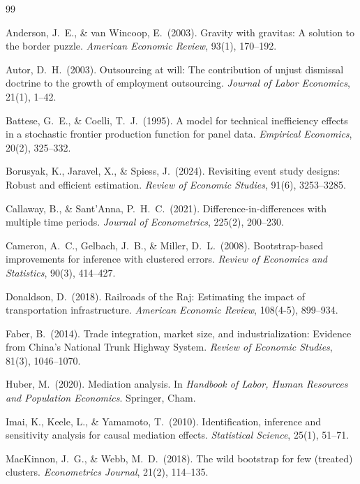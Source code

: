 \documentclass[12pt, a4paper]{article}
\begin{document}
\begin{thebibliography}{99}
\small
\setlength{\itemsep}{2pt}

 Anderson, J.\ E., \& van Wincoop, E.\ (2003). Gravity with gravitas: A solution to the border puzzle. \textit{American Economic Review}, 93(1), 170--192.

 Autor, D.\ H.\ (2003). Outsourcing at will: The contribution of unjust dismissal doctrine to the growth of employment outsourcing. \textit{Journal of Labor Economics}, 21(1), 1--42.

 Battese, G.\ E., \& Coelli, T.\ J.\ (1995). A model for technical inefficiency effects in a stochastic frontier production function for panel data. \textit{Empirical Economics}, 20(2), 325--332.

 Borusyak, K., Jaravel, X., \& Spiess, J.\ (2024). Revisiting event study designs: Robust and efficient estimation. \textit{Review of Economic Studies}, 91(6), 3253--3285.

 Callaway, B., \& Sant'Anna, P.\ H.\ C.\ (2021). Difference-in-differences with multiple time periods. \textit{Journal of Econometrics}, 225(2), 200--230.

 Cameron, A.\ C., Gelbach, J.\ B., \& Miller, D.\ L.\ (2008). Bootstrap-based improvements for inference with clustered errors. \textit{Review of Economics and Statistics}, 90(3), 414--427.

 Donaldson, D.\ (2018). Railroads of the Raj: Estimating the impact of transportation infrastructure. \textit{American Economic Review}, 108(4-5), 899--934.

 Faber, B.\ (2014). Trade integration, market size, and industrialization: Evidence from China's National Trunk Highway System. \textit{Review of Economic Studies}, 81(3), 1046--1070.

 Huber, M.\ (2020). Mediation analysis. In \textit{Handbook of Labor, Human Resources and Population Economics}. Springer, Cham.

 Imai, K., Keele, L., \& Yamamoto, T.\ (2010). Identification, inference and sensitivity analysis for causal mediation effects. \textit{Statistical Science}, 25(1), 51--71.

 MacKinnon, J.\ G., \& Webb, M.\ D.\ (2018). The wild bootstrap for few (treated) clusters. \textit{Econometrics Journal}, 21(2), 114--135.


\end{thebibliography}
\end{document}
